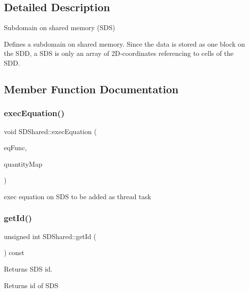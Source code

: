 \subsection{Detailed Description}
Subdomain on shared memory (S\+DS) 

Defines a subdomain on shared memory. Since the data is stored as one block on the S\+DD, a S\+DS is only an array of 2\+D-\/coordinates referencing to cells of the S\+DD. 

\subsection{Member Function Documentation}
\mbox{\label{classSDShared_a0ba4c821b3ee742a27d72d5401602d22}} 
\subsubsection{\texorpdfstring{exec\+Equation()}{execEquation()}}
{\footnotesize\ttfamily void S\+D\+Shared\+::exec\+Equation (\begin{DoxyParamCaption}\item[{eq\+Type \&}]{eq\+Func,  }\item[{const std\+::map$<$ std\+::string, \mbox{\hyperlink{classQuantity}{Quantity}}$<$ real $>$ $\ast$ $>$ \&}]{quantity\+Map }\end{DoxyParamCaption})}

exec equation on S\+DS to be added as thread task \mbox{\label{classSDShared_ab3a51f6ef83b411b8839a7953af5257d}} 
\subsubsection{\texorpdfstring{get\+Id()}{getId()}}
{\footnotesize\ttfamily unsigned int S\+D\+Shared\+::get\+Id (\begin{DoxyParamCaption}{ }\end{DoxyParamCaption}) const\hspace{0.3cm}{\ttfamily [inline]}}



Returns S\+DS id. 

\begin{DoxyReturn}{Returns}
id of S\+DS 
\end{DoxyReturn}
\mbox{\label{classSDShared_ae07fd636017e1a465d537a2f21b1ef96}} 
